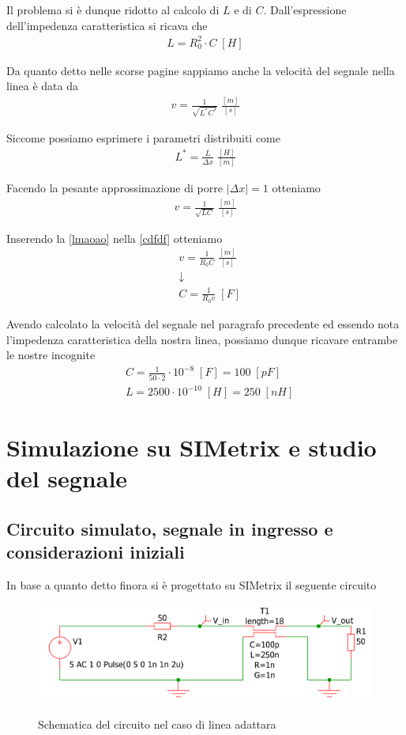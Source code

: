 \documentclass[a4paper,12pt]{report}
\newcommand{\firstpassage}{ \\ &\downarrow \nonumber \\}
\begin{document}
Il problema si è dunque ridotto al calcolo di $L$ e di $C$. 
Dall'espressione dell'impedenza caratteristica si ricava che
\begin{align}
L= R_0^2\cdot C  \; [H]\label{lmaoao}
\end{align}

Da quanto detto nelle scorse pagine sappiamo anche la velocità del segnale nella linea è data da
\begin{align}
v = \frac{1}{\sqrt{L^*C^*}} \; \frac{[m]}{[s]}
\end{align}

Siccome possiamo esprimere i parametri distribuiti come
\begin{align}
L^* = \frac{L}{\Delta x}  \; \frac{[H]}{[m]}
\end{align}

Facendo la pesante approssimazione di porre $|\Delta x|=1$ otteniamo
\begin{align}
v = \frac{1}{\sqrt{LC}} \label{cdfdf}  \; \frac{[m]}{[s]}
\end{align}

Inserendo la \ref{lmaoao} nella \ref{cdfdf} otteniamo
\begin{align}
&v = \frac{1}{R_0 C} \; \frac{[m]}{[s]} \firstpassage
&C = \frac{1}{R_0 v} \; [F]
\end{align}

Avendo calcolato la velocità del segnale nel paragrafo precedente ed essendo nota l'impedenza caratteristica della nostra linea, possiamo dunque ricavare entrambe le nostre incognite
\begin{align}
&C = \frac{1}{50 \cdot 2} \cdot 10^{-8} \; [F] = 100 \; [pF]\\
&L = 2500 \cdot  10^{-10} \; [H] = 250 \; [nH]
\end{align}



\section{Simulazione su SIMetrix e studio del segnale}

\subsection{Circuito simulato, segnale in ingresso e considerazioni iniziali}
In base a quanto detto finora si è progettato su SIMetrix il seguente circuito
\begin{figure}[!htb]
	\centering
	\includegraphics[width=\textwidth]{pictures/linea.png}
	\label{ergwg}
	\caption{\label{luegregegl} \small Schematica del circuito nel caso di linea adattara}
\end{figure}
\end{document}
